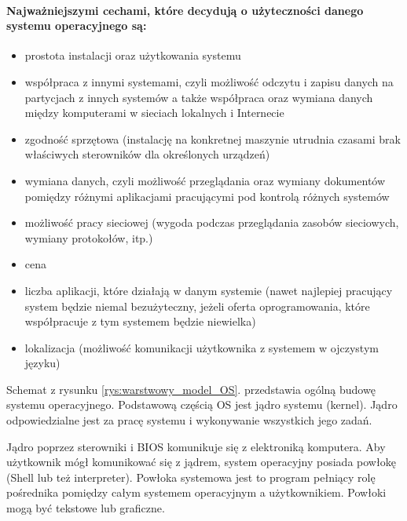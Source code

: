 \documentclass[a4paper,twoside]{report}
\begin{document}
\paragraph{Najważniejszymi cechami, które decydują o użyteczności danego systemu operacyjnego są:}
\begin{itemize}
\item prostota instalacji oraz użytkowania systemu
\item współpraca z innymi systemami, czyli możliwość odczytu i zapisu danych na partycjach z innych systemów a także współpraca oraz wymiana danych między komputerami w sieciach lokalnych i Internecie
\item zgodność sprzętowa (instalację na konkretnej maszynie utrudnia czasami brak właściwych sterowników dla określonych urządzeń)
\item wymiana danych, czyli możliwość przeglądania oraz wymiany dokumentów pomiędzy różnymi aplikacjami pracującymi pod kontrolą różnych systemów
\item możliwość pracy sieciowej (wygoda podczas przeglądania zasobów sieciowych, wymiany protokołów, itp.)
\item cena
\item liczba aplikacji, które działają w danym systemie (nawet najlepiej pracujący system będzie niemal bezużyteczny, jeżeli oferta oprogramowania, które współpracuje z tym systemem będzie niewielka)
\item lokalizacja (możliwość komunikacji użytkownika z systemem w ojczystym języku)
\end{itemize}

Schemat z rysunku \ref{rys:warstwowy_model_OS}. przedstawia ogólną budowę systemu operacyjnego. Podstawową częścią OS jest jądro systemu (kernel). Jądro odpowiedzialne jest za pracę systemu i wykonywanie wszystkich jego zadań. 

Jądro poprzez sterowniki i BIOS komunikuje się z elektroniką komputera. Aby użytkownik mógł komunikować się z jądrem, system operacyjny posiada powłokę (Shell lub też interpreter). Powłoka systemowa jest to program pełniący rolę pośrednika pomiędzy całym systemem operacyjnym a użytkownikiem. Powłoki mogą być tekstowe lub graficzne.
\end{document}
